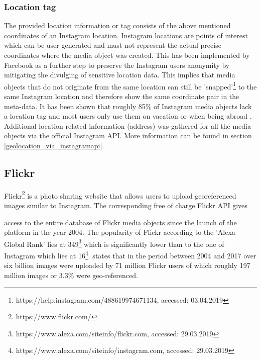 \subsubsection*{Location tag} \label{instagram_location_tag}
The provided location information or tag consists of the above mentioned coordinates of an Instagram location. Instagram locations are points of interest which can be user-generated and must not represent the actual precise coordinates where the media object was created. This has been implemented by Facebook as a further step to preserve the Instagram users anonymity by mitigating the divulging of sensitive location data. This implies that media objects that do not originate from the same location can still be 'snapped'\footnote{https://help.instagram.com/488619974671134, accessed: 03.04.2019} to the same Instagram location and therefore show the same coordinate pair in the meta-data.
It has been shown that roughly 85\% of Instagram media objects lack a location tag and most users only use them on vacation or when being abroad \parencite{Flatow2015}.
Additional location related information (address) was gathered for all the media objects via the official Instagram API. More information can be found in section \ref{geolocation_via_instagramapi}.



\subsection{Flickr} \label{flickr}
Flickr\footnote{https://www.flickr.com/} is a photo sharing website that allows users to upload georeferenced images similar to Instagram. The corresponding free of charge Flickr API gives

\renewcommand{\thefootnote}{\alph{footnote}}

access to the entire database of Flickr media objects since the launch of the platform in the year 2004. The popularity of Flickr according to the 'Alexa Global Rank' lies at 349\footnote{https://www.alexa.com/siteinfo/flickr.com, accessed: 29.03.2019} which is significantly lower than to the one of Instagram which lies at 16\footnote{https://www.alexa.com/siteinfo/instagram.com, accessed: 29.03.2019}. \textcite{Tenkanen2017} states that in the period between 2004 and 2017 over six billion images were uploaded by 71 million Flickr users of which roughly 197 million images or 3.3\% were geo-referenced. 

\renewcommand{\thefootnote}{\arabic{footnote}}

